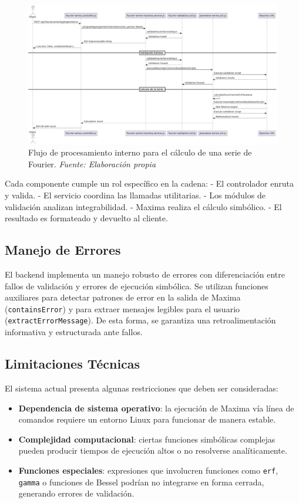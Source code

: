 \begin{figure}[H]
	\centering
	\includegraphics[width=1\textwidth]{img/chapter07/secuencia-back.pdf}
	\caption[Flujo de procesamiento interno para el cálculo de una serie de Fourier.]{Flujo de procesamiento interno para el cálculo de una serie de Fourier. \textit{Fuente: \textit{Elaboración propia}}}
	\label{fig:backend-flow}
\end{figure}



Cada componente cumple un rol específico en la cadena:
- El controlador enruta y valida.
- El servicio coordina las llamadas utilitarias.
- Los módulos de validación analizan integrabilidad.
- Maxima realiza el cálculo simbólico.
- El resultado es formateado y devuelto al cliente.

\subsection{Manejo de Errores}

El backend implementa un manejo robusto de errores con diferenciación entre fallos de validación y errores de ejecución simbólica. Se utilizan funciones auxiliares para detectar patrones de error en la salida de Maxima (\texttt{containsError}) y para extraer mensajes legibles para el usuario (\texttt{extractErrorMessage}). De esta forma, se garantiza una retroalimentación informativa y estructurada ante fallos.

\subsection{Limitaciones Técnicas}
El sistema actual presenta algunas restricciones que deben ser consideradas:

\begin{itemize}
	\item \textbf{Dependencia de sistema operativo}: la ejecución de Maxima vía línea de comandos requiere un entorno Linux para funcionar de manera estable.
	\item \textbf{Complejidad computacional}: ciertas funciones simbólicas complejas pueden producir tiempos de ejecución altos o no resolverse analíticamente.
	\item \textbf{Funciones especiales}: expresiones que involucren funciones como \texttt{erf}, \texttt{gamma} o funciones de Bessel podrían no integrarse en forma cerrada, generando errores de validación.
\end{itemize}


